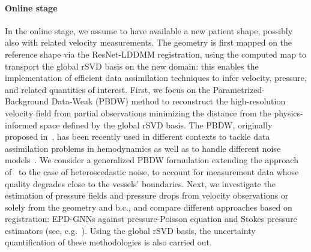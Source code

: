 \paragraph*{Online stage} In the online stage, we assume to have available a new patient shape, possibly also with related velocity measurements. 
The geometry is first mapped on the reference shape via the ResNet-LDDMM registration, using the computed map to transport the global rSVD basis on the new domain: this enables the implementation of efficient data assimilation techniques to infer velocity, pressure, and related quantities of interest.
%
First, we focus on the Parametrized-Background Data-Weak (PBDW) method to reconstruct the high-resolution velocity field from partial observations minimizing the distance from the physics-informed space defined by the global rSVD basis. The PBDW, originally proposed in~\cite{MPPY2015}, has been recently used in different contexts to tackle data assimilation problems in hemodynamics \cite{galarce2022state} as well as to handle different noise models~\cite{gong2019pbdw}. We consider a generalized PBDW formulation extending the approach of~\cite{gong2019pbdw} to the case of heteroscedastic noise, to account for measurement data whose quality degrades close to the vessels' boundaries. 
%
Next, we investigate the estimation of pressure fields and pressure drops from velocity observations or solely from the geometry and b.c., and compare different approaches based on registration: EPD-GNNs against pressure-Poisson equation and Stokes pressure estimators (see, e.g.~\cite{bertoglio2018relative}). Using the global rSVD basis, the uncertainty quantification of these methodologies is also carried out.\newline

